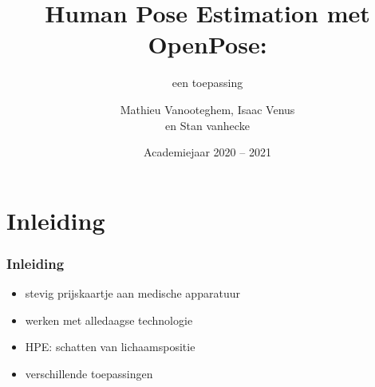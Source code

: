 \documentclass
   [kulak] %
   {kulakbeamer}
\title[HPE]{Human Pose Estimation met OpenPose:}
\subtitle{een toepassing}
\author[Korte naam]{Mathieu Vanooteghem, Isaac Venus \\ 
	en Stan vanhecke}
\institute[Kulak]{KU Leuven Kulak}
\date{Academiejaar 2020 -- 2021}
\begin{document}
\begin{titleframe}
\titlepage
\end{titleframe}

\begin{outlineframe}[Overzicht]
\tableofcontents
\end{outlineframe}


\section{Inleiding}

\begin{frame}
\frametitle{Inleiding}
	\begin{itemize}
		\item stevig prijskaartje aan medische apparatuur
		\item werken met alledaagse technologie
		\item HPE: schatten van lichaamspositie
		\item verschillende toepassingen
	\end{itemize}
\end{frame}
\end{document}
